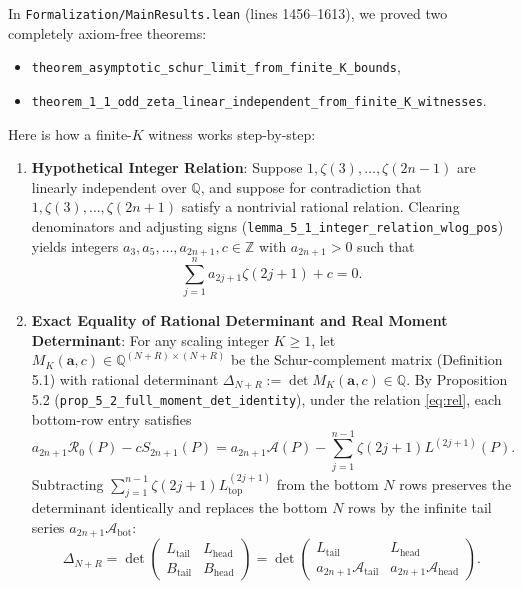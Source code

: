 \documentclass[11pt,a4paper]{article}
\begin{document}
In \texttt{Formalization/MainResults.lean} (lines 1456--1613), we proved two completely axiom-free theorems:
\begin{itemize}
  \item \texttt{theorem\_asymptotic\_schur\_limit\_from\_finite\_K\_bounds},
  \item \texttt{theorem\_1\_1\_odd\_zeta\_linear\_independent\_from\_finite\_K\_witnesses}.
\end{itemize}

Here is how a finite-$K$ witness works step-by-step:
\begin{enumerate}
  \item \textbf{Hypothetical Integer Relation}: Suppose $1, \zeta(3), \dots, \zeta(2n-1)$ are linearly independent over $\mathbb{Q}$, and suppose for contradiction that $1, \zeta(3), \dots, \zeta(2n+1)$ satisfy a nontrivial rational relation. Clearing denominators and adjusting signs (\texttt{lemma\_5\_1\_integer\_relation\_wlog\_pos}) yields integers $a_3, a_5, \dots, a_{2n+1}, c \in \mathbb{Z}$ with $a_{2n+1} > 0$ such that
  \begin{equation}\label{eq:rel}
    \sum_{j=1}^n a_{2j+1}\zeta(2j+1) + c = 0.
  \end{equation}

  \item \textbf{Exact Equality of Rational Determinant and Real Moment Determinant}:
  For any scaling integer $K \ge 1$, let $M_K(\mathbf{a}, c) \in \mathbb{Q}^{(N+R)\times(N+R)}$ be the Schur-complement matrix (Definition 5.1) with rational determinant $\Delta_{N+R} := \det M_K(\mathbf{a}, c) \in \mathbb{Q}$.
  By Proposition 5.2 (\texttt{prop\_5\_2\_full\_moment\_det\_identity}), under the relation \eqref{eq:rel}, each bottom-row entry satisfies
  \[
    a_{2n+1}\mathcal{R}_0(P) - c S_{2n+1}(P)
    = a_{2n+1}\mathcal{A}(P) - \sum_{j=1}^{n-1} \zeta(2j+1) L^{(2j+1)}(P).
  \]
  Subtracting $\sum_{j=1}^{n-1} \zeta(2j+1) L_{\mathrm{top}}^{(2j+1)}$ from the bottom $N$ rows preserves the determinant identically and replaces the bottom $N$ rows by the infinite tail series $a_{2n+1}\mathcal{A}_{\mathrm{bot}}$:
  \begin{equation}\label{eq:det_eq}
    \Delta_{N+R} = \det \begin{pmatrix} L_{\mathrm{tail}} & L_{\mathrm{head}} \\ B_{\mathrm{tail}} & B_{\mathrm{head}} \end{pmatrix}
    = \det \begin{pmatrix} L_{\mathrm{tail}} & L_{\mathrm{head}} \\ a_{2n+1}\mathcal{A}_{\mathrm{tail}} & a_{2n+1}\mathcal{A}_{\mathrm{head}} \end{pmatrix}.
  \end{equation}


\end{enumerate}
\end{document}
